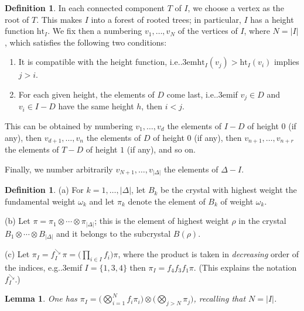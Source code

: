 \documentclass[12pt]{amsart}
\numberwithin{equation}{section}
\newtheorem{lem}[thm]{Lemma}
\theoremstyle{definition}
\newtheorem{defin}[thm]{Definition}
\def\eg{{e.g.}\kern.3em}
\def\ie{{i.e.}\kern.3em}
\def\haut{\mathrm{ht}} %
\def\sea{{\scriptscriptstyle\searrow}}
\begin{document}
\begin{defin}\label{def-order} 
In each connected component $T$ of $I$, we choose a vertex as the root of $T$. This makes $I$ 
into a forest of rooted trees; in particular, $I$ has a height function $\haut_I$. 
We fix then a numbering  $v_1,\dots, v_N$ of the vertices of $I$, where $N = \vert I \vert$, which satisfies the following two conditions: 
\begin{enumerate} 
\item It is compatible with the height function, \ie $\haut_I(v_j) > \haut_I(v_i)$ implies $j > i$. 

\item For each given height, the elements of $D$ come last, \ie if $v_j \in D$ and $v_i \in I - D$ 
have the same height $h$, then $i < j$.
\end{enumerate} 
This can be obtained by numbering $v_1,\dots, v_d$ the elements of $I - D$ of height $0$ (if any), 
then $v_{d+1},\dots, v_n$ the elements of $D $ of height $0$ (if any), then 
$v_{n+1},\dots, v_{n+r}$ the elements of $T - D$ of height $1$ (if any), and so on. 

Finally, we number arbitrarily $v_{N+1}, \dots, v_{\vert \Delta\vert}$ the elements of 
$\Delta - I$. 
\end{defin}



\begin{defin}\label{def-pi} (a) For $k = 1,\dots, \vert \Delta\vert$, let $B_k$ be the crystal with 
highest weight the fundamental weight $\omega_k$ and let $\pi_k$ denote the element of $B_k$ of weight 
$\omega_k$. 

\smallskip (b) 
Let $\pi =  \pi_1 \otimes \cdots \otimes \pi_{\vert \Delta\vert}$; this is the element of highest weight $\rho$ in the crystal 
$B_1\otimes \cdots \otimes B_{\vert \Delta\vert}$ and it belongs to the subcrystal $B(\rho)$. 

\smallskip (c) Let 
$\pi_I = f_I^\sea \, \pi = \Big(\prod_{i\in I} f_i \Big) \pi$, 
where the product is taken in \emph{decreasing} order of the indices, \eg if $I = \{1,3,4\}$ then 
$\pi_I = f_4 f_3 f_1 \pi$. (This explains the notation $f_I^\sea$.) 
\end{defin} 

\begin{lem}\label{lem-pi-I} 
One has $\pi_I = \Big( \bigotimes_{i=1}^N f_i \pi_i \Big) \otimes \Big( \bigotimes_{j > N} \pi_j \Big)$, recalling that 
$N = \vert I \vert$. 
\end{lem}
\end{document}
